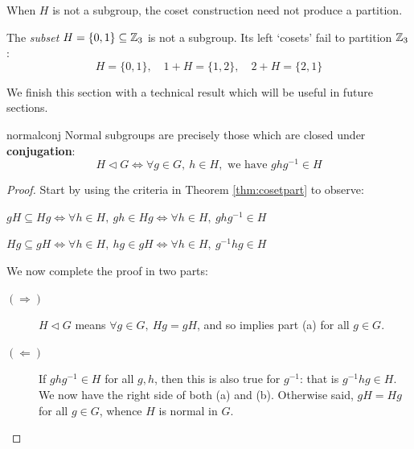 When $H$ is not a subgroup, the coset construction need not produce a partition.

\begin{example}{}{}
	The \emph{subset} $H=\{0,1\}\subseteq\mathbb{Z}_3$ is not a subgroup. Its left `cosets' fail to partition $\mathbb{Z}_3$:
	\[
		H=\{0,1\},\quad 1+H=\{1,2\},\quad 2+H=\{2,1\}
	\]
\end{example}

We finish this section with a technical result which will be useful in future sections.

\begin{cor}{}{normalconj}
	Normal subgroups are precisely those which are closed under \textbf{conjugation}:
  \[
  	H\triangleleft G\iff \forall g\in G,\ h\in H,\text{ we have }gh g^{-1}\in H
  \]
\end{cor}

\begin{proof}
	Start by using the criteria in Theorem \ref{thm:cosetpart} to observe:
	\begin{enumeratea}
	  \item $gH\subseteq Hg\iff \forall h\in H,\ gh\in Hg \iff \forall h\in H,\ gh g^{-1}\in H$
	  \item $Hg\subseteq gH\iff \forall h\in H,\ hg\in gH \iff \forall h\in H,\ g^{-1}hg\in H$
	\end{enumeratea}
	We now complete the proof in two parts:
	\begin{description}
		\item[\normalfont $(\Rightarrow)$] $H\triangleleft G$ means $\forall g\in G,\ Hg=gH$, and so implies part (a) for all $g\in G$. 
		\item[\normalfont $(\Leftarrow)$] If $gh g^{-1}\in H$ for all $g,h$, then this is also true for $g^{-1}$: that is $g^{-1}hg\in H$. We now have the right side of both (a) and (b). Otherwise said, $gH=Hg$ for all $g\in G$, whence $H$ is normal in $G$.\qedhere
	\end{description}
\end{proof}



